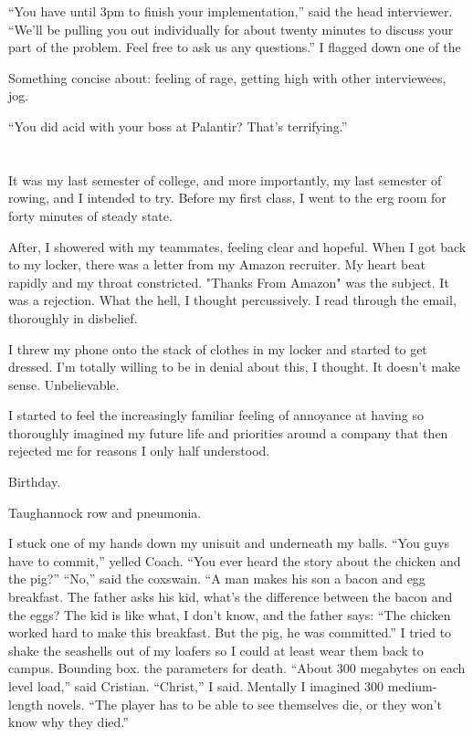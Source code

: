 ``You have until 3pm to finish your implementation,'' said the head interviewer.
``We'll be pulling you out individually for about twenty minutes to discuss your
part of the problem.  Feel free to ask us any questions.'' I flagged down one of
the 

Something concise about: feeling of rage, getting high with other interviewees, jog.

``You did acid with your boss at Palantir?  That's terrifying.''

\section{}

It was my last semester of college, and more importantly, my last semester of
rowing, and I intended to try.  Before my first class, I went to the erg room
for forty minutes of steady state. 

After, I showered with my teammates, feeling clear and hopeful.  When I got back
to my locker, there was a letter from my Amazon recruiter.  My heart beat
rapidly and my throat constricted.  "Thanks From Amazon" was the subject.  It
was a rejection.  What the hell, I thought percussively.  I read through the
email, thoroughly in disbelief.

I threw my phone onto the stack of clothes in my locker and started to get
dressed.  I'm totally willing to be in denial about this, I thought.  It doesn't
make sense.  Unbelievable.

I started to feel the increasingly familiar feeling of annoyance at having so
thoroughly imagined my future life and priorities around a company that then
rejected me for reasons I only half understood.

  

Birthday.

Taughannock row and pneumonia.

I stuck one of my hands down my unisuit and underneath my balls.  ``You guys
have to commit,'' yelled Coach.  ``You ever heard the story about the chicken and
the pig?'' ``No,'' said the coxswain.  ``A man makes his son a bacon and egg
breakfast.  The father asks his kid, what's the difference between the bacon
and the eggs?  The kid is like what, I don't know, and the father says: ``The
chicken worked hard to make this breakfast.  But the pig, he was committed.'' I
tried to shake the seashells out of my loafers so I could at least wear them
back to campus.  Bounding box.  the parameters for death.  ``About 300 megabytes
on each level load,'' said Cristian.  ``Christ,'' I said.  Mentally I imagined 300
medium-length novels.  ``The player has to be able to see themselves die, or
they won't know why they died.'' 

